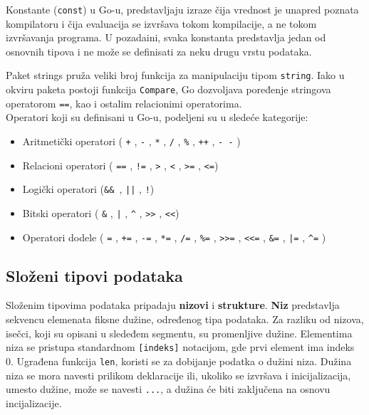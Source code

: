 \documentclass[12pt,oneside]{memoir}
\begin{document}
Konstante (\texttt{const}) u Go-u, predstavljaju izraze čija vrednost je unapred poznata kompilatoru i čija evaluacija se izvršava tokom kompilacije, a ne tokom izvršavanja programa. U pozadaini, svaka konstanta predstavlja jedan od osnovnih tipova i ne može se definisati za neku drugu vrstu podataka. 

Paket strings pruža veliki broj funkcija za manipulaciju tipom \texttt{string}. Iako u okviru paketa postoji funkcija \texttt{Compare}, Go dozvoljava poređenje stringova operatorom \texttt{==}, kao i ostalim relacionimi operatorima.
\\

Operatori koji su definisani u Go-u, podeljeni su u sledeće kategorije:
\begin{itemize}

\item Aritmetički operatori ( \texttt{+} ,  \texttt{-} , \texttt{*} ,  \texttt{/} ,  \texttt{\%} ,  \texttt{++} ,   \texttt{- -} )
\item Relacioni operatori ( \texttt{==} ,  \texttt{!=} ,  \texttt{>} ,  \texttt{<} ,  \texttt{>=} ,  \texttt{<=})
\item Logički operatori (\texttt{\&\& },  \texttt{||} ,  \texttt{!})
\item Bitski operatori ( \texttt{\&} ,  \texttt{|} ,  \texttt{\^} ,  \texttt{>{}>} ,  \texttt{<{}<})
\item Operatori dodele ( \texttt{=} ,  \texttt{+=} ,  \texttt{-=} ,  \texttt{*=} ,  \texttt{/=} ,  \texttt{\%=} ,   \texttt{>{}>=} ,  \texttt{<{}<=} ,  \texttt{\&=} ,  \texttt{|=} ,  \texttt{\^{}=} )

\end{itemize}

\subsection{Složeni tipovi podataka}
Složenim tipovima podataka pripadaju \textbf{nizovi} i \textbf{strukture}. \textbf{Niz} predstavlja sekvencu elemenata fiksne dužine, određenog tipa podataka. Za razliku od nizova, isečci, koji su opisani u sledeđem segmentu, su promenljive dužine. Elementima niza se pristupa standardnom \texttt{[indeks]} notacijom, gde prvi element ima indeks 0. Ugrađena funkcija \texttt{len}, koristi se za dobijanje podatka o dužini niza. Dužina niza se mora navesti prilikom deklaracije ili, ukoliko se izvršava i inicijalizacija, umesto dužine, može se navesti \texttt{...}, a dužina će biti zaključena na osnovu incijalizacije.
\end{document}
